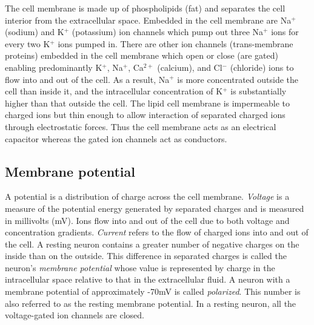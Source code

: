The cell membrane is made up of phospholipids (fat) and separates the cell interior from the extracellular space. Embedded in the cell membrane are Na$^{+}$ (sodium) and K$^{+}$ (potassium) ion channels which pump out three Na$^{+}$ ions for every two K$^{+}$ ions pumped in. There are other ion channels (trans-membrane proteins) embedded in the cell membrane which
open or close (are gated)  enabling predominantly K$^{+}$, Na$^{+}$, Ca$^{2+}$ (calcium), and Cl$^{-}$ (chloride) ions to flow into and out of the cell. As a result, Na$^{+}$ is more concentrated outside the cell than inside it, and the intracellular concentration of K$^{+}$ is substantially higher than that outside the cell.
The lipid cell membrane is impermeable to charged ions but thin enough to allow interaction
of separated charged ions through electrostatic forces. 
Thus the cell membrane acts as an electrical capacitor whereas the gated ion channels act as conductors.

\subsection{Membrane potential}
A potential is a distribution of charge across the cell membrane.
\textit{Voltage} is a measure of the potential energy generated by separated charges and is measured in millivolts (mV). Ions flow into and out of the cell due to both voltage and concentration gradients. \textit{Current} refers to the flow of charged ions into and out of the cell. A resting neuron contains a greater number of negative charges on the inside than on the outside. 
This difference in separated charges is called the neuron's \textit{membrane potential}
whose value is represented by charge in the intracellular space relative to that in the extracellular fluid. A neuron with a membrane potential of approximately -70mV is called \textit{polarized}. This number is also referred to as the resting membrane potential. In a resting neuron, all the voltage-gated ion channels are closed. 

